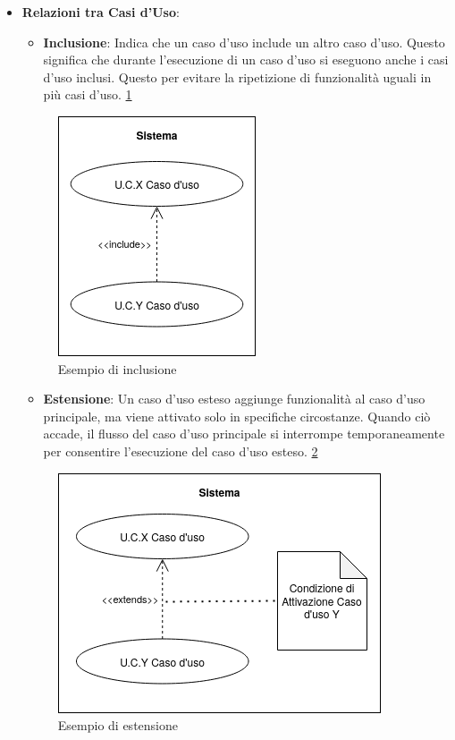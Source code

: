 \begin{itemize}
    \item \textbf{Relazioni tra Casi d’Uso}:
    \begin{itemize}
        \item \textbf{Inclusione}: Indica che un caso d’uso include un altro caso d’uso. Questo significa che durante l'esecuzione di un caso d'uso si eseguono anche i casi d'uso inclusi. Questo per evitare la ripetizione di funzionalità uguali in più casi d'uso. \ref{fig:inclusione}
    \end{itemize}
    

    \begin{figure}[H]
        \centering
        \includegraphics{../../img/include.png}
        \caption{Esempio di inclusione}
        \label{fig:inclusione}
    \end{figure}

    
    \begin{itemize}
        \item \textbf{Estensione}: Un caso d'uso esteso aggiunge funzionalità al caso d'uso principale, ma viene attivato solo in specifiche circostanze. Quando ciò accade, il flusso del caso d'uso principale si interrompe temporaneamente per consentire l'esecuzione del caso d'uso esteso. \ref{fig:estensione}
    \end{itemize}

    \begin{figure}[H]
        \centering
        \includegraphics{../../img/estensione.png}
        \caption{Esempio di estensione}
        \label{fig:estensione}
    \end{figure}
    

\end{itemize}
